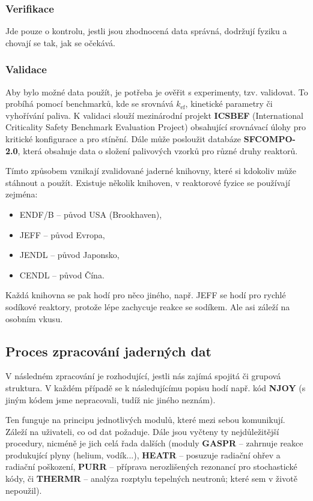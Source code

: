 \subsubsection{Verifikace}

Jde pouze o kontrolu, jestli jsou zhodnocená data správná, dodržují fyziku a chovají se tak, jak se očekává.

\subsubsection{Validace}

Aby bylo možné data použít, je potřeba je ověřit s experimenty, tzv. validovat. To probíhá pomocí benchmarků, kde se srovnává $k_\text{ef}$, kinetické parametry či vyhořívání paliva. K validaci slouží mezinárodní projekt \textbf{ICSBEF} (International Criticality Safety Benchmark Evaluation Project) obsahující srovnávací úlohy pro kritické konfigurace a pro stínění. Dále může posloužit databáze \textbf{SFCOMPO-2.0}, která obsahuje data o složení palivových vzorků pro různé druhy reaktorů.

Tímto způsobem vznikají zvalidované jaderné knihovny, které si kdokoliv může stáhnout a použít. Existuje několik knihoven, v reaktorové fyzice se používají zejména:

\begin{itemize}
  \item ENDF/B -- původ USA (Brookhaven),
  \item JEFF -- původ Evropa,
  \item JENDL -- původ Japonsko,
  \item CENDL -- původ Čína.
\end{itemize}

Každá knihovna se pak hodí pro něco jiného, např. JEFF se hodí pro rychlé sodíkové reaktory, protože lépe zachycuje reakce se sodíkem. Ale asi záleží na osobním vkusu.

\subsection{Proces zpracování jaderných dat}

V následném zpracování je rozhodující, jestli nás zajímá spojitá či grupová struktura. V každém případě se k následujícímu popisu hodí např. kód \textbf{NJOY} (s jiným kódem jsme nepracovali, tudíž nic jiného neznám).

Ten funguje na principu jednotlivých modulů, které mezi sebou komunikují. Záleží na uživateli, co od dat požaduje. Dále jsou vyčteny ty nejdůležitější procedury, nicméně je jich celá řada dalších (moduly \textbf{GASPR} -- zahrnuje reakce produkující plyny (helium, vodík...), \textbf{HEATR} -- posuzuje radiační ohřev a radiační poškození, \textbf{PURR} -- příprava nerozlišených rezonancí pro stochastické kódy, či \textbf{THERMR} -- analýza rozptylu tepelných neutronů; které sem v životě nepoužil).

